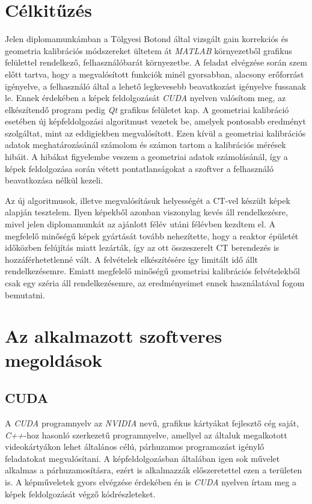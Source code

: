 \documentclass[a4paper,12pt]{article}
\begin{document}
\section{Célkitűzés}


Jelen diplomamunkámban a Tölgyesi Botond által vizsgált gain korrekciós és geometria kalibrációs módszereket ültetem át \emph{MATLAB} környezetből grafikus felülettel rendelkező, felhasználóbarát környezetbe. A feladat elvégzése során szem előtt tartva, hogy a megvalósított funkciók minél gyorsabban, alacsony erőforrást igényelve, a felhasználó által a lehető legkevesebb beavatkozást igényelve fussanak le. Ennek érdekében a képek feldolgozását \emph{CUDA} nyelven valósítom meg, az elkészítendő program pedig \emph{Qt} grafikus felületet kap. A geometriai kalibráció esetében új képfeldolgozási algoritmust vezetek be, amelyek pontosabb eredményt szolgáltat, mint az eddigiekben megvalósított. Ezen kívül a geometriai kalibrációs adatok meghatározásánál számolom és számon tartom a kalibrációs mérések hibáit. A hibákat figyelembe veszem a geometriai adatok számolásánál, így a képek feldolgozása során vétett pontatlanságokat a szoftver a felhasználó beavatkozása nélkül kezeli.


Az új algoritmusok, illetve megvalósításuk helyességét a CT-vel készült képek alapján tesztelem. Ilyen képekből azonban  viszonylag kevés áll rendelkezésre, mivel jelen diplomamunkát az ajánlott félév utáni félévben kezdtem el. A megfelelő minőségű képek gyártását tovább nehezítette, hogy a reaktor épületét időközben felújítás miatt lezárták, így az ott összeszerelt CT berendezés is hozzáférhetetlenné vált. A felvételek elkészítésére így limitált idő állt rendelkezésemre. Emiatt megfelelő minőségű geometriai kalibrációs felvételekből csak egy széria áll rendelkezésemre, az eredményeimet ennek használatával fogom bemutatni.





\section{Az alkalmazott szoftveres megoldások}

\subsection{CUDA}
\label{sec:cuda}


A \emph{CUDA} programnyelv az \emph{NVIDIA} nevű, grafikus kártyákat fejlesztő cég saját, \emph{C++}-hoz hasonló szerkezetű programnyelve, amellyel az általuk megalkotott videokártyákon lehet általános célú, párhuzamos programozást igénylő feladatokat megvalósítani. A képfeldolgozásban általában igen sok művelet alkalmas a párhuzamosításra, ezért is alkalmazzák előszeretettel ezen a területen is. A képműveletek gyors elvégzése érdekében én is \emph{CUDA} nyelven írtam meg a képek feldolgozását végző kódrészleteket. 
\end{document}

